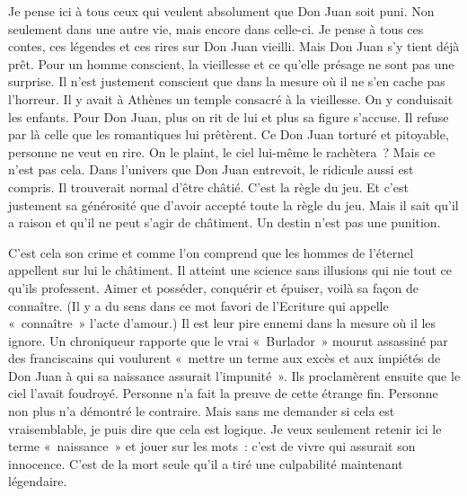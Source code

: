 \documentclass{book}
\begin{document}
Je pense ici à tous ceux qui veulent absolument que Don Juan soit puni. Non seulement dans une autre vie, mais encore dans celle-ci. Je pense à tous ces contes, ces légendes et ces rires sur Don Juan vieilli. Mais Don Juan s'y tient déjà prêt. Pour un homme conscient, la vieillesse et ce qu'elle présage ne sont pas une surprise. Il n'est justement conscient que dans la mesure où il ne s'en cache pas l'horreur. Il y avait à Athènes un temple consacré à la vieillesse. On y conduisait les enfants. Pour Don Juan, plus on rit de lui et plus sa figure s'accuse. Il refuse par là celle que les romantiques lui prêtèrent. Ce Don Juan torturé et pitoyable, personne ne veut en rire. On le plaint, le ciel lui-même le rachètera ? Mais ce n'est pas cela. Dans l'univers que Don Juan entrevoit, le ridicule aussi est compris. Il trouverait normal d'être châtié. C'est la règle du jeu. Et c'est justement sa générosité que d'avoir accepté toute la règle du jeu. Mais il sait qu'il a raison et qu'il ne peut s'agir de châtiment. Un destin n'est pas une punition.

C'est cela son crime et comme l'on comprend que les hommes de l'éternel appellent sur lui le châtiment. Il atteint une science sans illusions qui nie tout ce qu'ils professent. Aimer et posséder, conquérir et épuiser, voilà sa façon de connaître. (Il y a du sens dans ce mot favori de l'Ecriture qui appelle « connaître » l'acte d'amour.) Il est leur pire ennemi dans la mesure où il les ignore. Un chroniqueur rapporte que le vrai « Burlador » mourut assassiné par des franciscains qui voulurent « mettre un terme aux excès et aux impiétés de Don Juan à qui sa naissance assurait l'impunité ». Ils proclamèrent ensuite que le ciel l'avait foudroyé. Personne n'a fait la preuve de cette étrange fin. Personne non plus n'a démontré le contraire. Mais sans me demander si cela est vraisemblable, je puis dire que cela est logique. Je veux seulement retenir ici le terme « naissance » et jouer sur les mots : c'est de vivre qui assurait son innocence. C'est de la mort seule qu'il a tiré une culpabilité maintenant légendaire.
\end{document}
